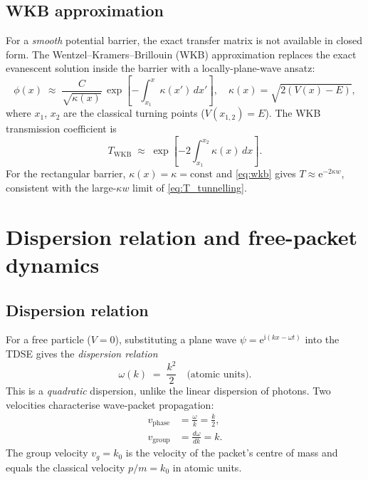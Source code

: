 \documentclass[12pt, a4paper]{article}
\newcommand{\ii}{\mathrm{i}}          %
\newcommand{\ee}{\mathrm{e}}          %
\begin{document}
\subsection{WKB approximation}

For a \emph{smooth} potential barrier, the exact transfer matrix is
not available in closed form.  The Wentzel--Kramers--Brillouin (WKB)
approximation replaces the exact evanescent solution inside the barrier
with a locally-plane-wave ansatz:
\begin{equation}
  \phi(x) \;\approx\;
  \frac{C}{\sqrt{\kappa(x)}}\,\exp\!\left[-\int_{x_1}^{x}\kappa(x')\,dx'\right],
  \quad \kappa(x) = \sqrt{2(V(x)-E)},
\end{equation}
where $x_1$, $x_2$ are the classical turning points ($V(x_{1,2}) = E$).
The WKB transmission coefficient is
\begin{equation}
  T_\text{WKB} \;\approx\; \exp\!\left[-2\int_{x_1}^{x_2}\kappa(x)\,dx\right].
  \label{eq:wkb}
\end{equation}
For the rectangular barrier, $\kappa(x) = \kappa = \text{const}$ and
\eqref{eq:wkb} gives $T \approx \ee^{-2\kappa w}$, consistent with the
large-$\kappa w$ limit of \eqref{eq:T_tunnelling}.

\section{Dispersion relation and free-packet dynamics}
\label{app:dispersion}

\subsection{Dispersion relation}

For a free particle ($V=0$), substituting a plane wave
$\psi = \ee^{\ii(kx - \omega t)}$ into the TDSE gives the
\emph{dispersion relation}
\begin{equation}
  \omega(k) \;=\; \frac{k^2}{2} \quad \text{(atomic units)}.
\end{equation}
This is a \emph{quadratic} dispersion, unlike the linear dispersion of
photons.  Two velocities characterise wave-packet propagation:
\begin{align}
  v_\text{phase} &= \frac{\omega}{k} = \frac{k}{2}, \\
  v_\text{group} &= \frac{d\omega}{dk} = k.
\end{align}
The group velocity $v_g = k_0$ is the velocity of the packet's centre
of mass and equals the classical velocity $p/m = k_0$ in atomic units.
\end{document}
